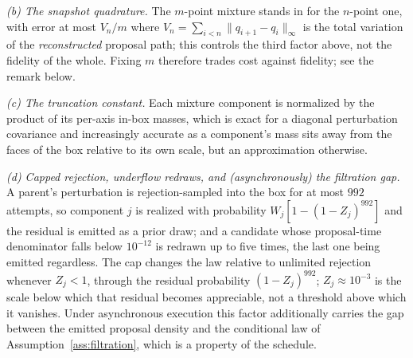 \documentclass[pdflatex,sn-mathphys-num]{sn-jnl}
\theoremstyle{plain}
\theoremstyle{definition}
\begin{document}
\begin{appendices}
\emph{(b) The snapshot quadrature.} The $m$-point mixture stands in for the $n$-point one, with error at most $V_n/m$ where $V_n=\sum_{i<n}\|q_{i+1}-q_i\|_\infty$ is the total variation of the \emph{reconstructed} proposal path; this controls the third factor above, not the fidelity of the whole. Fixing $m$ therefore trades cost against fidelity; see the remark below.

\emph{(c) The truncation constant.} Each mixture component is normalized by the product of its per-axis in-box masses, which is exact for a diagonal perturbation covariance and increasingly accurate as a component's mass sits away from the faces of the box relative to its own scale, but an approximation otherwise.

\emph{(d) Capped rejection, underflow redraws, and (asynchronously) the filtration gap.} A parent's perturbation is rejection-sampled into the box for at most $992$ attempts, so component $j$ is realized with probability $W_j[1-(1-Z_j)^{992}]$ and the residual is emitted as a prior draw; and a candidate whose proposal-time denominator falls below $10^{-12}$ is redrawn up to five times, the last one being emitted regardless. The cap changes the law relative to unlimited rejection whenever $Z_j<1$, through the residual probability $(1-Z_j)^{992}$; $Z_j\approx10^{-3}$ is the scale below which that residual becomes appreciable, not a threshold above which it vanishes. Under asynchronous execution this factor additionally carries the gap between the emitted proposal density and the conditional law of Assumption~\ref{ass:filtration}, which is a property of the schedule.


\end{appendices}
\end{document}
